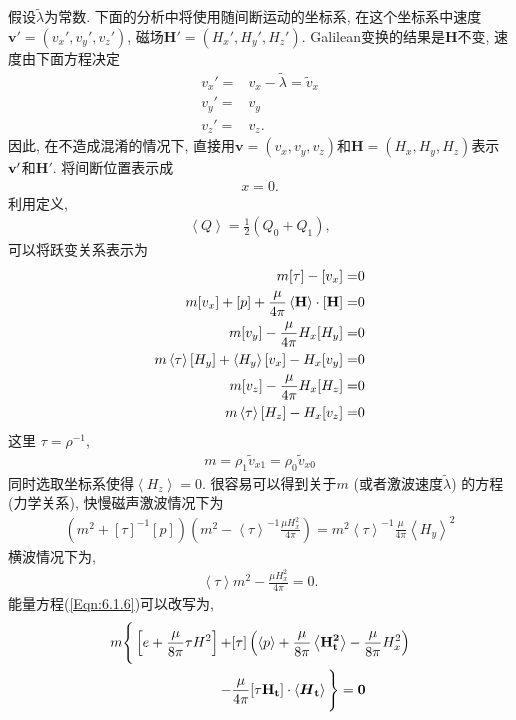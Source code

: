 \documentclass[10.5pt
]{article}
\begin{document}
假设$\tilde\lambda$为常数. 下面的分析中将使用随间断运动的坐标系,
在这个坐标系中速度$\boldsymbol{v}' = (v_x', v_y', v_z')$, 磁场$\boldsymbol{H'} = (H_x', H_y',
H_z')$. Galilean变换的结果是$\boldsymbol{H}$不变, 速度由下面方程决定
\begin{align}
v_x' = & v_x - \tilde\lambda = \tilde v_x \nonumber\\
v_y' = & v_y \nonumber\\
v_z' = & v_z. \nonumber
\end{align}
因此, 在不造成混淆的情况下, 直接用$\boldsymbol{v} = (v_x, v_y, v_z)$和$\boldsymbol{H} = (H_x, H_y, H_z)$表示${\bf
v'}$和$\boldsymbol{H}'$. 将间断位置表示成
\begin{align}
x = 0.\nonumber
\end{align}
利用定义,
\begin{eqnarray*}
\left<Q\right> = \frac{1}{2}(Q_0 + Q_1),
\end{eqnarray*}
可以将跃变关系表示为
\begin{align}
m[\tau] - [v_x] =& 0 \label{Eqn:6.1.4a}
\\
m[v_x] + [p] + \frac{\mu}{4\pi} \left< \bf H \right> \cdot [\bf H ] =&
0\label{Eqn:6.1.5a}
\\
m[v_y] - \frac{\mu}{4\pi} H_x [H_y] =& 0\label{Eqn:6.1.7a}
\\
m \left<\tau \right> [H_y] + \left< H_y \right> [v_x] - H_x [v_y] =& 0\label{Eqn:6.1.8a}
\\
m [v_z] - \frac{\mu}{4\pi} H_x [H_z] =& 0
\\
m \left< \tau \right> [H_z] - H_x [v_z] =& 0\label{Eqn:6.1.10a}
\end{align}
这里 $\tau = \rho^{-1}$,
\begin{align}
m = \rho_1 \tilde v_{x1} = \rho_0 \tilde v_{x0}
\end{align}
同时选取坐标系使得$\left< H_z \right> = 0$. 很容易可以得到关于$m$
(或者激波速度$\tilde\lambda$) 的方程(力学关系), 快慢磁声激波情况下为
\begin{align}
(m^2 + [\tau]^{-1}[p]) \left( m^2 - \left<\tau\right>^{-1} \frac{\mu H_x^2}{4\pi} \right)
= m^2 \left<\tau\right>^{-1} \frac{\mu}{4\pi}
\left<H_y\right>^2\label{Eqn:6.1.13}
\end{align}
横波情况下为,
\begin{align}
\left<\tau\right> m^2 - \frac{\mu H_x^2}{4\pi} = 0.\label{Eqn:6.1.14}
\end{align}
能量方程(\ref{Eqn:6.1.6})可以改写为,
\begin{align}
m \Bigg\{ \left[ e + \frac{\mu}{8\pi} \tau H^2 \right] +& [\tau] \left( \left<p\right>
+
\frac{\mu}{8\pi} \left<\bf H_t^2\right> - \frac{\mu}{8\pi} H_x^2 \right)
\nonumber\\
-& \frac{\mu}{4\pi} [\tau \bf H_t] \cdot \left< \boldsymbol{H}_t \right> \Bigg\} = 0
\end{align}
\end{document}
